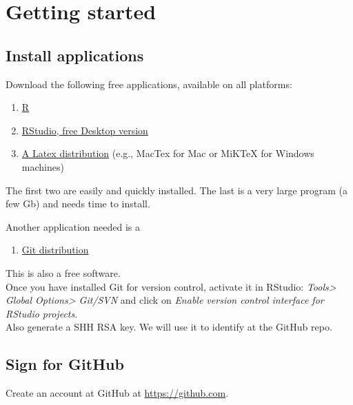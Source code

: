 \documentclass[]{book}
\providecommand{\tightlist}{%
  \setlength{\itemsep}{0pt}\setlength{\parskip}{0pt}}
\theoremstyle{definition}
\theoremstyle{definition}
\theoremstyle{definition}
\theoremstyle{remark}
\begin{document}
\hypertarget{getsarted}{%
\chapter{Getting started}\label{getsarted}}

\hypertarget{install-applications}{%
\section{Install applications}\label{install-applications}}

Download the following free applications, available on all platforms:

\begin{enumerate}
\def\labelenumi{\arabic{enumi}.}
\tightlist
\item
  \href{https://cran.uni-muenster.de/}{R}
\item
  \href{https://www.rstudio.com/products/rstudio/download/\#download}{RStudio,
  free Desktop version}
\item
  \href{https://www.latex-project.org/get/}{A Latex distribution} (e.g.,
  MacTex for Mac or MiKTeX for Windows machines)
\end{enumerate}

The first two are easily and quickly installed. The last is a very large
program (a few Gb) and needs time to install.

Another application needed is a

\begin{enumerate}
\def\labelenumi{\arabic{enumi}.}
\setcounter{enumi}{3}
\tightlist
\item
  \href{https://git-scm.com/downloads}{Git distribution}
\end{enumerate}

This is also a free software.\\
Once you have installed Git for version control, activate it in RStudio:
\emph{Tools\textgreater{} Global Options\textgreater{} Git/SVN} and
click on \emph{Enable version control interface for RStudio projects}.\\
Also generate a SHH RSA key. We will use it to identify at the GitHub
repo.

\hypertarget{sign-for-github}{%
\section{Sign for GitHub}\label{sign-for-github}}

Create an account at GitHub at
\href{https://github.com/join}{https://github.com}.
\end{document}
